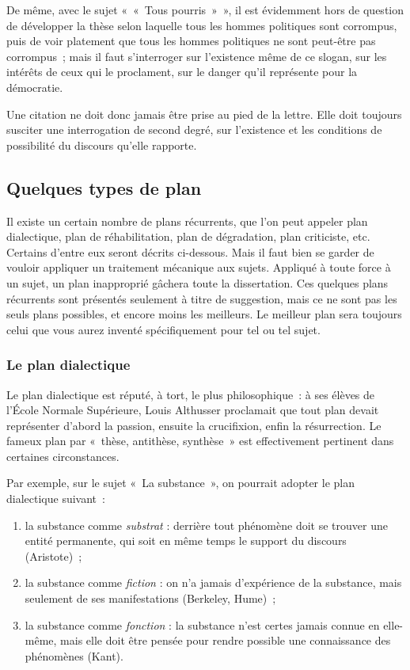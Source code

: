 \documentclass[a4paper]{article}
\begin{document}
De même, avec le sujet « « Tous pourris » », il est évidemment hors de
question de développer la thèse selon laquelle tous les hommes
politiques sont corrompus, puis de voir platement que tous les hommes
politiques ne sont peut-être pas corrompus ; mais il faut s'interroger
sur l'existence même de ce slogan, sur les intérêts de ceux qui le
proclament, sur le danger qu'il représente pour la démocratie.

Une citation ne doit donc jamais être prise au pied de la lettre. Elle
doit toujours susciter une interrogation de second degré, sur
l'existence et les conditions de possibilité du discours qu'elle
rapporte.
    
\subsection{Quelques types de plan}
\label{sec-3-2}


Il existe un certain nombre de plans récurrents, que l'on peut appeler
plan dialectique, plan de réhabilitation, plan de dégradation, plan
criticiste, etc. Certains d'entre eux seront décrits ci-dessous. Mais il
faut bien se garder de vouloir appliquer un traitement mécanique aux
sujets. Appliqué à toute force à un sujet, un plan inapproprié gâchera
toute la dissertation. Ces quelques plans récurrents sont présentés
seulement à titre de suggestion, mais ce ne sont pas les seuls plans
possibles, et encore moins les meilleurs. Le meilleur plan sera toujours
celui que vous aurez inventé spécifiquement pour tel ou tel sujet.
\subsubsection{Le plan dialectique}
\label{sec-3-2-1}


Le plan dialectique est réputé, à tort, le plus philosophique : à ses
élèves de l'École Normale Supérieure, Louis Althusser proclamait que
tout plan devait représenter d'abord la passion, ensuite la crucifixion,
enfin la résurrection. Le fameux plan par « thèse, antithèse, synthèse »
est effectivement pertinent dans certaines circonstances.

Par exemple, sur le sujet « La substance », on pourrait adopter le plan
dialectique suivant :

\begin{enumerate}
\item la substance comme \emph{substrat} : derrière tout phénomène doit se
   trouver une entité permanente, qui soit en même temps le support du
   discours (Aristote) ;
\item la substance comme \emph{fiction} : on n'a jamais d'expérience de la
   substance, mais seulement de ses manifestations (Berkeley, Hume) ;
\item la substance comme \emph{fonction} : la substance n'est certes jamais
   connue en elle-même, mais elle doit être pensée pour rendre possible
   une connaissance des phénomènes (Kant).
\end{enumerate}
\end{document}
